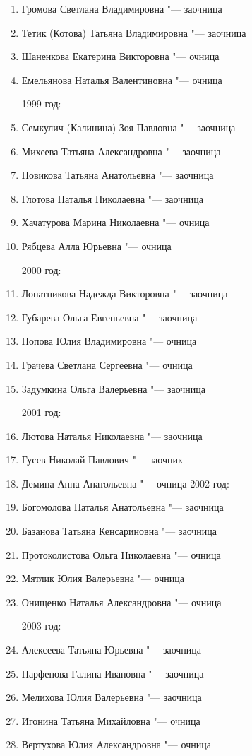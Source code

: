 \begin{enumerate}[nosep]
{1998 год:}
	\item Громова Светлана Владимировна "--- заочница
	\item Тетик (Котова) Татьяна Владимировна "--- заочница
	\item Шаненкова Екатерина Викторовна "--- очница
	\item Емельянова Наталья Валентиновна "--- очница

{1999 год:}
	\item Семкулич (Калинина) Зоя Павловна "--- заочница
	\item Михеева Татьяна Александровна "--- заочница
	\item Новикова Татьяна Анатольевна "--- заочница
	\item Глотова Наталья Николаевна "--- заочница
	\item Хачатурова Марина Николаевна "--- очница
	\item Рябцева Алла Юрьевна "--- очница

{2000 год:}
	\item Лопатникова Надежда Викторовна "--- заочница
	\item Губарева Ольга Евгеньевна "--- заочница
	\item Попова Юлия Владимировна "--- очница
	\item Грачева Светлана Сергеевна "--- очница
	\item 3адумкина Ольга Валерьевна "--- заочница

{2001 год:}
	\item Лютова Наталья Николаевна "--- заочница
	\item Гусев Николай Павлович "--- заочник
	\item Демина Анна Анатольевна "--- очница
{2002 год:}
	\item Богомолова Наталья Анатольевна "--- заочница
	\item Базанова Татьяна Кенсариновна "--- заочница
	\item Протоколистова Ольга Николаевна "--- очница
	\item Мятлик Юлия Валерьевна "--- очница
	\item Онищенко Наталья Александровна "--- очница

{2003 год:}
	\item Алексеева Татьяна Юрьевна "--- заочница
	\item Парфенова Галина Ивановна "--- заочница
	\item Мелихова Юлия Валерьевна "--- заочница
	\item Игонина Татьяна Михайловна "--- очница
	\item Вертухова Юлия Александровна "--- очница


\end{enumerate}
